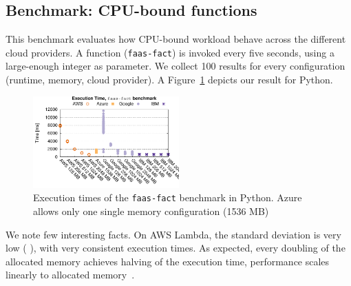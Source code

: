 \subsection{Benchmark: CPU-bound functions}
\label{sec:general_test}
This benchmark evaluates how CPU-bound workload behave across the different cloud providers.
A function (\texttt{faas-fact}) is invoked every five seconds, using a large-enough integer as parameter. 
We collect 100 results for every configuration (runtime, memory, cloud provider).
A%
Figure~\ref{fig:general_python_plot} depicts our result for Python.

\begin{figure}[!t]
\centering
\includegraphics[width=0.5\textwidth]{bilder/general_python/cpufact.pdf}
\caption{Execution times of the \texttt{faas-fact} benchmark in Python. Azure allows only one single memory configuration (1536 MB)}
\label{fig:general_python_plot}

\end{figure}

We note few interesting facts.
On \gls{AWS} Lambda, the standard deviation is very low ( ), with very consistent execution times. 
As expected, every doubling of the allocated memory achieves halving of the execution time, performance scales linearly to allocated memory~\cite{AWSLambdaConfig}. 

